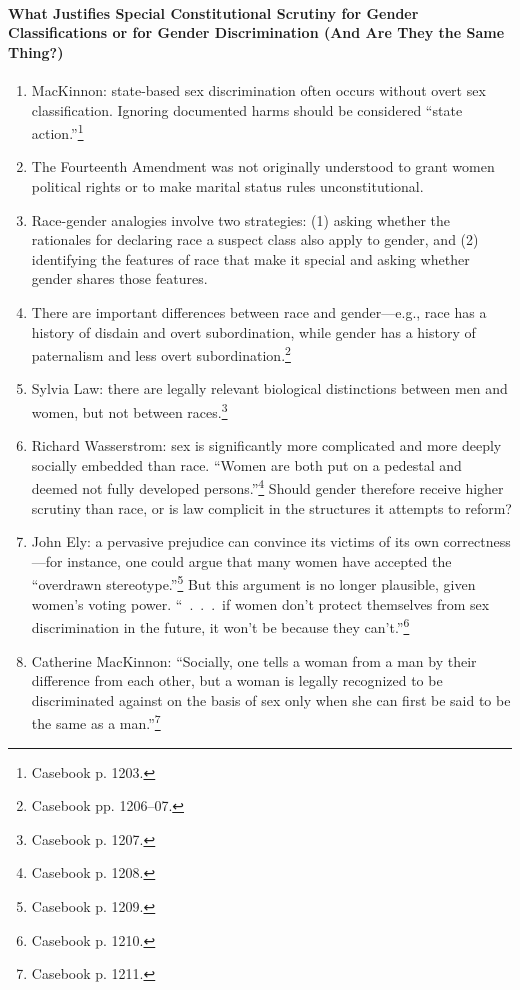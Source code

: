 \paragraph{What Justifies Special Constitutional Scrutiny for Gender 
Classifications or for Gender Discrimination (And Are They the Same Thing?)}

\begin{enumerate}
    \item MacKinnon: state-based sex discrimination often occurs without overt 
    sex classification. Ignoring documented harms should be considered ``state 
    action.''\footnote{Casebook p. 1203.}
    \item The Fourteenth Amendment was not originally understood to grant 
    women political rights or to make marital status rules 
    unconstitutional.
    \item Race-gender analogies involve two strategies: (1) asking whether the 
    rationales for declaring race a suspect class also apply to gender, and 
    (2) identifying the features of race that make it special and asking 
    whether gender shares those features.
    \item There are important differences between race and gender---e.g., race 
    has a history of disdain and overt subordination, while gender has a 
    history of paternalism and less overt subordination.\footnote{Casebook pp. 
    1206--07.}
    \item Sylvia Law: there are legally relevant biological distinctions 
    between men and women, but not between races.\footnote{Casebook p. 1207.}
    \item Richard Wasserstrom: sex is significantly more complicated and more 
    deeply socially embedded than race. ``Women are both put on a pedestal and 
    deemed not fully developed persons.''\footnote{Casebook p. 1208.} Should 
    gender therefore receive higher scrutiny than race, or is law complicit in 
    the structures it attempts to reform?
    \item John Ely: a pervasive prejudice can convince its victims of its own 
    correctness---for instance, one could argue that many women have accepted 
    the ``overdrawn stereotype.''\footnote{Casebook p. 1209.} But this 
    argument is no longer plausible, given women's voting power. ``~.~.~.~if 
    women don't protect themselves from sex discrimination in the future, it 
    won't be because they can't.''\footnote{Casebook p. 1210.}
    \item Catherine MacKinnon: ``Socially, one tells a woman from a man by 
    their difference from each other, but a woman is legally recognized to be 
    discriminated against on the basis of sex only when she can first be said 
    to be the same as a man.''\footnote{Casebook p. 1211.}
\end{enumerate}
 
